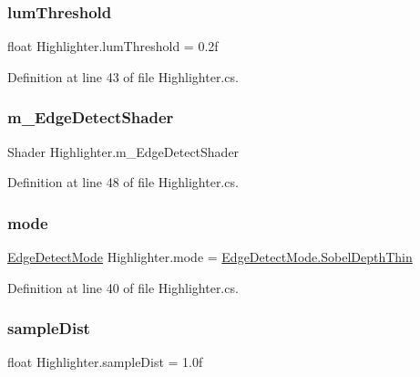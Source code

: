 \subsubsection{\texorpdfstring{lum\+Threshold}{lumThreshold}}
{\footnotesize\ttfamily float Highlighter.\+lum\+Threshold = 0.\+2f}



Definition at line 43 of file Highlighter.\+cs.

\mbox{\label{class_highlighter_a8c79a2a4ac04780d9df045df1ea7f025}} 
\subsubsection{\texorpdfstring{m\+\_\+\+Edge\+Detect\+Shader}{m\_EdgeDetectShader}}
{\footnotesize\ttfamily Shader Highlighter.\+m\+\_\+\+Edge\+Detect\+Shader}



Definition at line 48 of file Highlighter.\+cs.

\mbox{\label{class_highlighter_ab7cc5f640025462979c4da50a25c0e4e}} 
\subsubsection{\texorpdfstring{mode}{mode}}
{\footnotesize\ttfamily \mbox{\hyperlink{class_highlighter_a585a556fee5d14c362fbf2fada52a073}{Edge\+Detect\+Mode}} Highlighter.\+mode = \mbox{\hyperlink{class_highlighter_a585a556fee5d14c362fbf2fada52a073a98e5dbe639f7850feb04dce03f5744ee}{Edge\+Detect\+Mode.\+Sobel\+Depth\+Thin}}}



Definition at line 40 of file Highlighter.\+cs.

\mbox{\label{class_highlighter_af924ebf1c49c5adf1851234227bcc72d}} 
\subsubsection{\texorpdfstring{sample\+Dist}{sampleDist}}
{\footnotesize\ttfamily float Highlighter.\+sample\+Dist = 1.\+0f}



